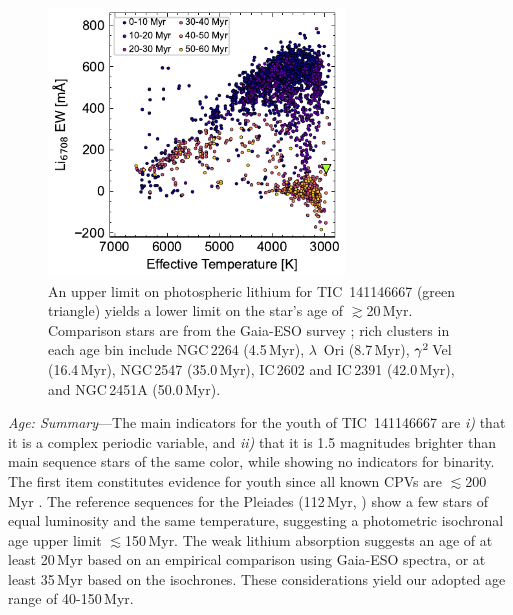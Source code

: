 \documentclass{nature3}
\begin{document}
\begin{methods}
\begin{figure}[!t]
  \centering
  \includegraphics[width=0.7\textwidth]{figures/sf2.pdf}
  \caption{An upper limit on photospheric lithium for TIC~141146667
  (green triangle) yields a lower limit on the star's age of $\gtrsim$20\,Myr.
  Comparison stars are from the Gaia-ESO survey
  \cite{Jeffries2023}; rich clusters in each age bin include
  NGC\,2264 (4.5\,Myr), $\lambda$~Ori (8.7\,Myr), ${\rm \gamma}^2$\,Vel (16.4\,Myr), NGC\,2547
  (35.0\,Myr), IC\,2602 and IC\,2391 (42.0\,Myr), and NGC\,2451A
  (50.0\,Myr). }
  \label{fig:liew_population}
\end{figure}




{\it Age: Summary}---The main indicators for the youth of
TIC~141146667 are {\it i)} that it is a complex periodic variable, and
{\it ii)} that it is 1.5 magnitudes brighter than main sequence stars
of the same color, while showing no indicators for binarity.  The
first item constitutes evidence for youth since all known CPVs are
$\lesssim$200\,Myr \cite{Bouma2024}.  The reference sequences for the
Pleiades (112\,Myr, \cite{Dahm2015}) show a few stars of equal
luminosity and the same temperature, suggesting a photometric
isochronal age upper limit $\lesssim$150\,Myr.  The weak lithium
absorption suggests an age of at least 20\,Myr based on an empirical
comparison using Gaia-ESO spectra, or at least 35\,Myr based on the
\cite{Feiden2016} isochrones.  These considerations yield our adopted
age range of 40-150\,Myr.






\end{methods}
\end{document}
